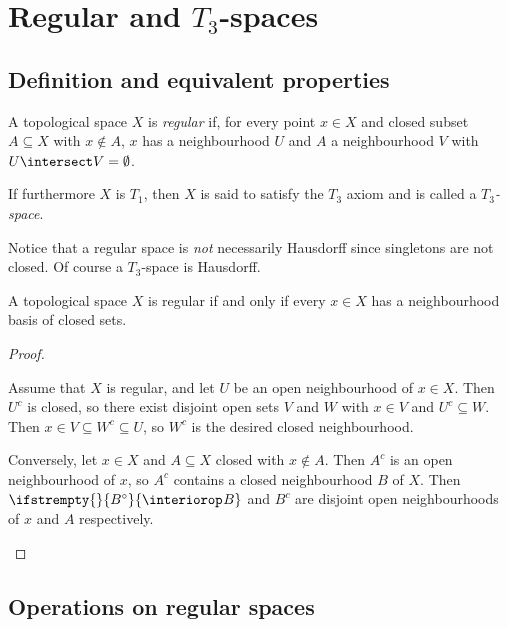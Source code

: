 \documentclass[article, a4paper, 11pt, oneside]{memoir}
\numberwithin{equation}{chapter}
\renewcommand\interior[2][]{%
    \ifstrempty{#1}{%
        #2^{\circ}
    }{%
        \interiorop_{#1}#2
    }%
}
\begin{document}
\chapter[Regular and T3-spaces][Regular and $T_3$-spaces]{Regular and $T_3$-spaces}

\section{Definition and equivalent properties}

\begin{definition}
    A topological space $X$ is \emph{regular} if, for every point $x \in X$ and closed subset $A \subseteq X$ with $x \not\in A$, $x$ has a neighbourhood $U$ and $A$ a neighbourhood $V$ with $U \intersect V = \emptyset$.

    If furthermore $X$ is $T_1$, then $X$ is said to satisfy the $T_3$ axiom and is called a \emph{$T_3$-space}.
\end{definition}
%
Notice that a regular space is \emph{not} necessarily Hausdorff since singletons are not closed. Of course a $T_3$-space is Hausdorff.


\begin{proposition}
    \label{thm:regular-equivalent-properties}
    A topological space $X$ is regular if and only if every $x \in X$ has a neighbourhood basis of closed sets.
\end{proposition}

\begin{proof}
\begin{proofsec}
    Assume that $X$ is regular, and let $U$ be an open neighbourhood of $x \in X$. Then $U^c$ is closed, so there exist disjoint open sets $V$ and $W$ with $x \in V$ and $U^c \subseteq W$. Then $x \in V \subseteq W^c \subseteq U$, so $W^c$ is the desired closed neighbourhood.

    Conversely, let $x \in X$ and $A \subseteq X$ closed with $x \not\in A$. Then $A^c$ is an open neighbourhood of $x$, so $A^c$ contains a closed neighbourhood $B$ of $X$. Then $\interior{B}$ and $B^c$ are disjoint open neighbourhoods of $x$ and $A$ respectively.
\end{proofsec}
\end{proof}


\section{Operations on regular spaces}
\end{document}
